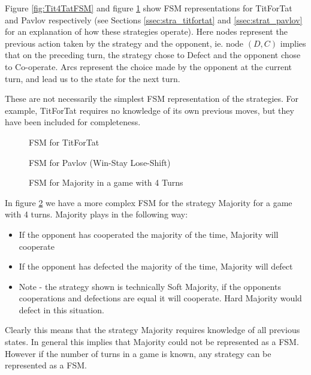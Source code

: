 Figure \ref{fig:Tit4TatFSM} and figure \ref{fig:PavlovFSM} show FSM representations for TitForTat and Pavlov respectively (see Sections \ref{ssec:stra_titfortat} and \ref{ssec:strat_pavlov} for an explanation of how these strategies operate).
Here nodes represent the previous action taken by the strategy and the opponent, ie. node $(D, C)$ implies that on the preceding turn, the strategy chose to Defect and the opponent chose to Co-operate.
Arcs represent the choice made by the opponent at the current turn, and lead us to the state for the next turn.

These are not necessarily the simplest FSM representation of the strategies.
For example, TitForTat requires no knowledge of its own previous moves, but they have been included for completeness.

\begin{figure}[!hbtp]
    \begin{center}
        
        \caption{FSM for TitForTat}\label{fig:Tit4TatFSM}
        
        \caption{FSM for Pavlov (Win-Stay Lose-Shift)}\label{fig:PavlovFSM}
    \end{center}
\end{figure}

\begin{figure}[!hbtp]
    \begin{center}
        
        \caption{FSM for Majority in a game with 4 Turns}\label{fig:MajorityFSM}
    \end{center}
\end{figure}

In figure \ref{fig:MajorityFSM} we have a more complex FSM for the strategy Majority for a game with 4 turns.
Majority plays in the following way:

\begin{itemize}
  \item If the opponent has cooperated the majority of the time, Majority will cooperate
  \item If the opponent has defected the majority of the time, Majority will defect
  \item Note - the strategy shown is technically Soft Majority, if the opponents cooperations and defections are equal it will cooperate. Hard Majority would defect in this situation.
\end{itemize}

Clearly this means that the strategy Majority requires knowledge of all previous states.
In general this implies that Majority could not be represented as a FSM.
However if the number of turns in a game is known, any strategy can be represented as a FSM.



